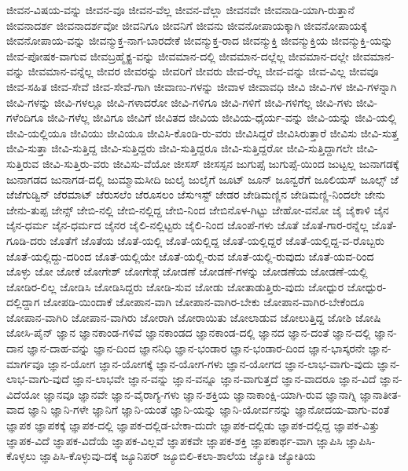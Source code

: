{ಜೀವನ-ವಿಷಯ-ವನ್ನು
ಜೀವನ-ವೂ
ಜೀವನ-ವೆಲ್ಲ
ಜೀವನ-ವೆಲ್ಲಾ
ಜೀವನವೇ
ಜೀವನಾಡಿ-ಯಾಗಿ-ರುತ್ತಾನೆ
ಜೀವನಾದರ್ಶ
ಜೀವನಾದರ್ಶವೋ
ಜೀವನಿಗೂ
ಜೀವನಿಗೆ
ಜೀವನು
ಜೀವನೋಪಾಯಕ್ಕಾಗಿ
ಜೀವನೋಪಾಯಕ್ಕೆ
ಜೀವನೋಪಾಯ-ವನ್ನು
ಜೀವನ್ಮುಕ್ತ-ನಾಗ-ಬಾರದೇಕೆ
ಜೀವನ್ಮುಕ್ತ-ರಾದ
ಜೀವನ್ಮುಕ್ತಿ
ಜೀವನ್ಮುಕ್ತಿಯ
ಜೀವನ್ಮುಕ್ತಿ-ಯನ್ನು
ಜೀವ-ಪೋಷಕ-ವಾಗುವ
ಜೀವಬ್ರಹ್ಮೈಕ್ಯ-ವನ್ನು
ಜೀವಮಾನ-ದಲ್ಲಿ
ಜೀವಮಾನ-ದಲ್ಲೆಲ್ಲ
ಜೀವಮಾನ-ದಲ್ಲೇ
ಜೀವಮಾನ-ವನ್ನು
ಜೀವಮಾನ-ವನ್ನೆಲ್ಲ
ಜೀವರ
ಜೀವರನ್ನು
ಜೀವರಿಗೆ
ಜೀವರು
ಜೀವ-ರೆಲ್ಲ
ಜೀವ-ವನ್ನು
ಜೀವ-ವಿಲ್ಲ
ಜೀವವೂ
ಜೀವ-ಸಹಿತ
ಜೀವ-ಸೇವೆ
ಜೀವ-ಸೇವೆ-ಗಾಗಿ
ಜೀವಾಣು-ಗಳನ್ನು
ಜೀವಾಳ
ಜೀವಾವಧಿ
ಜೀವಿ
ಜೀವಿ-ಗಳ
ಜೀವಿ-ಗಳನ್ನಾಗಿ
ಜೀವಿ-ಗಳನ್ನು
ಜೀವಿ-ಗಳಲ್ಲೂ
ಜೀವಿ-ಗಳಾದರೋ
ಜೀವಿ-ಗಳಿಗೂ
ಜೀವಿ-ಗಳಿಗೆ
ಜೀವಿ-ಗಳಿಗೆಲ್ಲ
ಜೀವಿ-ಗಳು
ಜೀವಿ-ಗಳೆಂದಿಗೂ
ಜೀವಿ-ಗಳೆಲ್ಲ
ಜೀವಿಗೂ
ಜೀವಿಗೆ
ಜೀವಿತದ
ಜೀವಿಯ
ಜೀವಿಯ-ಧೈರ್ಯ-ವನ್ನು
ಜೀವಿ-ಯನ್ನು
ಜೀವಿ-ಯಲ್ಲಿ
ಜೀವಿ-ಯಲ್ಲಿಯೂ
ಜೀವಿಯು
ಜೀವಿಯೂ
ಜೀವಿಸಿ-ಕೊಂಡಿ-ರು-ವರು
ಜೀವಿಸಿದ್ದರೆ
ಜೀವಿಸಿರುತ್ತಾರೆ
ಜೀವಿಸು
ಜೀವಿ-ಸುತ್ತ
ಜೀವಿ-ಸುತ್ತಾ
ಜೀವಿ-ಸುತ್ತಿದ್ದ
ಜೀವಿ-ಸುತ್ತಿದ್ದರು
ಜೀವಿ-ಸುತ್ತಿದ್ದರೂ
ಜೀವಿ-ಸುತ್ತಿದ್ದರೋ
ಜೀವಿ-ಸುತ್ತಿದ್ದಾಗಲೇ
ಜೀವಿ-ಸುತ್ತಿರುವ
ಜೀವಿ-ಸುತ್ತಿರು-ವರು
ಜೀವಿಸು-ವೆಯೋ
ಜೀಸಸ್
ಜೀಸಸ್ಸನ
ಜುಗುಪ್ಸೆ
ಜುಗುಪ್ಸೆ-ಯಿಂದ
ಜುಟ್ಟಲ್ಲ
ಜುನಾಗಡಕ್ಕೆ
ಜುನಾಗಡದ
ಜುನಾಗಡ-ದಲ್ಲಿ
ಜುಮ್ಮಾಮಸೀದಿ
ಜುಲೈ
ಜುಲೈಗೆ
ಜೂಟ್
ಜೂನ್
ಜೂನ್ವರೆಗೆ
ಜೂಲಿಯಸ್
ಜೂಲ್ಸ್
ಜೆ
ಜೆಜೆಗುಡ್ವಿನ್
ಜೆರಮಾಟ್
ಜೆರುಸಲೆಂ
ಜೆರೂಸಲಂ
ಜೆಸುಇಸ್ಟ್
ಜೇಡರ
ಜೇಡಿಮಣ್ಣಿನ
ಜೇಡಿಮಣ್ಣಿ-ನಿಂದಲೇ
ಜೇನು
ಜೇನು-ತುಪ್ಪ
ಜೇನ್ಸ್
ಜೇಬಿ-ನಲ್ಲಿ
ಜೇಬಿ-ನಲ್ಲಿದ್ದ
ಜೇಬಿ-ನಿಂದ
ಜೇಬಿನೊಳ-ಗಿಟ್ಟು
ಜೇಹೋ-ವನೋ
ಜೈ
ಜೈಕಾಳಿ
ಜೈನ
ಜೈನ-ಧರ್ಮ
ಜೈನ-ಧರ್ಮದ
ಜೈನರ
ಜೈಲಿ-ನಲ್ಲಿಟ್ಟರು
ಜೈಲಿ-ನಿಂದ
ಜೊಂಪೆ-ಗಳು
ಜೊತೆ
ಜೊತೆ-ಗಾರ-ರನ್ನೆಲ್ಲ
ಜೊತೆ-ಗೂಡಿ-ದರು
ಜೊತೆಗೆ
ಜೊತೆಯ
ಜೊತೆ-ಯಲ್ಲಿ
ಜೊತೆ-ಯಲ್ಲಿದ್ದ
ಜೊತೆ-ಯಲ್ಲಿದ್ದರೆ
ಜೊತೆ-ಯಲ್ಲಿದ್ದ-ವ-ರೊಬ್ಬರು
ಜೊತೆ-ಯಲ್ಲಿದ್ದು-ದರಿಂದ
ಜೊತೆ-ಯಲ್ಲಿಯೇ
ಜೊತೆ-ಯಲ್ಲಿ-ರುವ
ಜೊತೆ-ಯಲ್ಲಿ-ರುವುದು
ಜೊತೆ-ಯವ-ರಿಂದ
ಜೊಳ್ಳು
ಜೋ
ಜೋಕೆ
ಜೋಗೇಶ್
ಜೋಗೇಶ್ಗೆ
ಜೋಡಣೆ
ಜೋಡಣೆ-ಗಳನ್ನು
ಜೋಡಣೆಯ
ಜೋಡಣೆ-ಯಲ್ಲಿ
ಜೋಡಿರ-ಲಿಲ್ಲ
ಜೋಡಿಸಿ
ಜೋಡಿಸಿದ್ದರು
ಜೋಡಿ-ಸುವ
ಜೋಡು
ಜೋತಾಡುತ್ತಿರು-ವುದು
ಜೋಧ್ಪುರ
ಜೋಧ್ಪುರ-ದಲ್ಲಿದ್ದಾಗ
ಜೋಪಡಿ-ಯಿಂದಾಕೆ
ಜೋಪಾನ-ವಾಗಿ
ಜೋಪಾನ-ವಾಗಿರ-ಬೇಕು
ಜೋಪಾನ-ವಾಗಿರ-ಬೇಕೆಂದೂ
ಜೋಪಾನ-ವಾಗಿರಿ
ಜೋಪಾನ-ವಾಗಿರು
ಜೋರಾಗಿ
ಜೋರಾಯಿತು
ಜೋಲಾಡುವ
ಜೋಲುತ್ತಿದ್ದ
ಜೋಶಿ
ಜೋಷಿ
ಜೋಸಿ-ಪೈನ್
ಜ್ಞಾನ
ಜ್ಞಾನಕಾಂಡ-ಗಳಿವೆ
ಜ್ಞಾನಕಾಂಡದ
ಜ್ಞಾನಕಾಂಡ-ದಲ್ಲಿ
ಜ್ಞಾನದ
ಜ್ಞಾನ-ದಂತೆ
ಜ್ಞಾನ-ದಲ್ಲಿ
ಜ್ಞಾನ-ದಾನ
ಜ್ಞಾನ-ದಾಹ-ವನ್ನು
ಜ್ಞಾನ-ದಿಂದ
ಜ್ಞಾನನಿಧಿ
ಜ್ಞಾನ-ಭಂಡಾರ
ಜ್ಞಾನ-ಭಂಡಾರ-ದಿಂದ
ಜ್ಞಾನ-ಭಾಸ್ಕರನೇ
ಜ್ಞಾನ-ಮಾರ್ಗವೂ
ಜ್ಞಾನ-ಯೋಗ
ಜ್ಞಾನ-ಯೋಗಕ್ಕೆ
ಜ್ಞಾನ-ಯೋಗ-ಗಳು
ಜ್ಞಾನ-ಯೋಗದ
ಜ್ಞಾನ-ಲಾಭ-ವಾಗು-ವುದು
ಜ್ಞಾನ-ಲಾಭ-ವಾಗು-ವುದೆ
ಜ್ಞಾನ-ಲಾಭವೇ
ಜ್ಞಾನ-ವನ್ನು
ಜ್ಞಾನ-ವನ್ನೂ
ಜ್ಞಾನ-ವಾಗುತ್ತದೆ
ಜ್ಞಾನ-ವಾದರೂ
ಜ್ಞಾನ-ವಿದೆ
ಜ್ಞಾನ-ವಿದೆಯೋ
ಜ್ಞಾನವೂ
ಜ್ಞಾನವೇ
ಜ್ಞಾನ-ವೈರಾಗ್ಯ-ಗಳು
ಜ್ಞಾನ-ಶಕ್ತಿಯ
ಜ್ಞಾನಾಕಾಂಕ್ಷಿ-ಯಾಗಿ-ರುವ
ಜ್ಞಾನಾಗ್ನಿ
ಜ್ಞಾನಾತೀತ-ವಾದ
ಜ್ಞಾನಿ
ಜ್ಞಾನಿ-ಗಳೇ
ಜ್ಞಾನಿಗೆ
ಜ್ಞಾನಿ-ಯಂತೆ
ಜ್ಞಾನಿ-ಯನ್ನು
ಜ್ಞಾನಿ-ಯೋರ್ವನನ್ನು
ಜ್ಞಾನೋದಯ-ವಾಗು-ವಂತೆ
ಜ್ಞಾಪಕ
ಜ್ಞಾಪಕಕ್ಕೆ
ಜ್ಞಾಪಕ-ದಲ್ಲಿ
ಜ್ಞಾಪಕ-ದಲ್ಲಿಡ-ಬೇಕಾ-ದುದೇ
ಜ್ಞಾಪಕ-ದಲ್ಲಿಡು
ಜ್ಞಾಪಕ-ದಲ್ಲಿದ್ದ
ಜ್ಞಾಪಕ-ವಿತ್ತು
ಜ್ಞಾಪಕ-ವಿದೆ
ಜ್ಞಾಪಕ-ವಿದೆಯೆ
ಜ್ಞಾಪಕ-ವಿಲ್ಲವೆ
ಜ್ಞಾಪಕವೇ
ಜ್ಞಾಪಕ-ಶಕ್ತಿ
ಜ್ಞಾಪಕಾರ್ಥ-ವಾಗಿ
ಜ್ಞಾಪಿಸಿ
ಜ್ಞಾಪಿಸಿ-ಕೊಳ್ಳಲು
ಜ್ಞಾಪಿಸಿ-ಕೊಳ್ಳುವು-ದಕ್ಕೆ
ಜ್ಯೂನಿಪರ್
ಜ್ಯೂಬಿಲಿ-ಕಲಾ-ಶಾಲೆಯ
ಜ್ಯೋತಿ
ಜ್ಯೋತಿಯ
}
